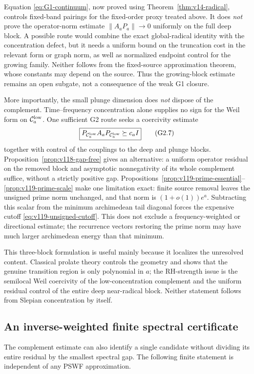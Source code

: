 \documentclass[11pt]{article}
\theoremstyle{remark}
\newcommand{\norm}[1]{\left\lVert #1\right\rVert}
\begin{document}
Equation \eqref{eq:G1-continuum}, now proved using Theorem~\ref{thm:v14-radical}, controls fixed-band pairings for the fixed-order proxy treated above. It does \emph{not} prove the operator-norm estimate $\norm{A_aP_a}\to0$ uniformly on the full deep block. A possible route would combine the exact global-radical identity with the concentration defect, but it needs a uniform bound on the truncation cost in the relevant form or graph norm, as well as normalized endpoint control for the growing family. Neither follows from the fixed-source approximation theorem, whose constants may depend on the source. Thus the growing-block estimate remains an open subgate, not a consequence of the weak G1 closure.

More importantly, the small plunge dimension does \emph{not} dispose of the complement.  Time--frequency concentration alone supplies no sign for the Weil form on $\mathcal C_a^{\rm low}$.  One sufficient G2 route seeks a coercivity estimate
\[
 \boxed{
 P_{\mathcal C_a^{\rm low}}A_aP_{\mathcal C_a^{\rm low}}\succeq c_a I
 }
 \tag{G2.7}
\]
together with control of the couplings to the deep and plunge blocks.
Proposition~\ref{prop:v118-gap-free} gives an alternative: a uniform
operator residual on the removed block and asymptotic nonnegativity of
its whole complement suffice, without a strictly positive gap.  Propositions~\ref{prop:v119-prime-essential}--\ref{prop:v119-prime-scale}
make one limitation exact: finite source removal leaves the unsigned
prime norm unchanged, and that norm is $(1+o(1))e^a$.
Subtracting this scalar from the minimum archimedean tail diagonal
forces the expensive cutoff \eqref{eq:v119-unsigned-cutoff}.
This does not exclude a frequency-weighted or directional estimate;
the recurrence vectors restoring the prime norm may have much larger
archimedean energy than that minimum.

This three-block formulation is useful mainly because it localizes the unresolved content.  Classical prolate theory controls the geometry and shows that the genuine transition region is only polynomial in $a$; the RH-strength issue is the semilocal Weil coercivity of the low-concentration complement and the uniform residual control of the entire deep near-radical block.  Neither statement follows from Slepian concentration by itself.

\subsection*{An inverse-weighted finite spectral certificate}
The complement estimate can also identify a single candidate without
dividing its entire residual by the smallest spectral gap.
The following finite statement is independent of any PSWF approximation.
\end{document}
